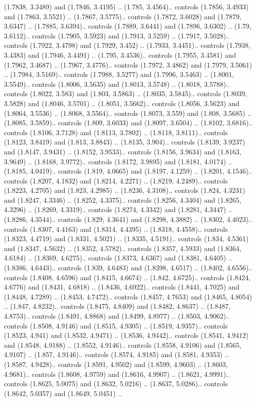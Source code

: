 (1.7838, 3.3489) and (1.7846, 3.4195) .. (1.785, 3.4564).. controls (1.7856, 3.4933) and (1.7863, 3.5521) .. (1.7867, 3.5775).. controls (1.7872, 3.6028) and (1.7879, 3.6347) .. (1.7885, 3.6394).. controls (1.7889, 3.6441) and (1.7896, 3.6302) .. (1.79, 3.6112).. controls (1.7905, 3.5923) and (1.7913, 3.5259) .. (1.7917, 3.5028).. controls (1.7922, 3.4798) and (1.7929, 3.452) .. (1.7933, 3.4451).. controls (1.7938, 3.4383) and (1.7946, 3.4491) .. (1.795, 3.4536).. controls (1.7955, 3.4581) and (1.7962, 3.4687) .. (1.7967, 3.4776).. controls (1.7972, 3.4862) and (1.7979, 3.5061) .. (1.7984, 3.5169).. controls (1.7988, 3.5277) and (1.7996, 3.5463) .. (1.8001, 3.5549).. controls (1.8006, 3.5635) and (1.8013, 3.5748) .. (1.8018, 3.5788).. controls (1.8022, 3.583) and (1.803, 3.5863) .. (1.8035, 3.5845).. controls (1.8039, 3.5828) and (1.8046, 3.5701) .. (1.8051, 3.5662).. controls (1.8056, 3.5623) and (1.8064, 3.5536) .. (1.8068, 3.5564).. controls (1.8073, 3.559) and (1.808, 3.5685) .. (1.8085, 3.5859).. controls (1.809, 3.6033) and (1.8097, 3.6504) .. (1.8102, 3.6816).. controls (1.8106, 3.7128) and (1.8113, 3.7802) .. (1.8118, 3.8111).. controls (1.8123, 3.8419) and (1.813, 3.8843) .. (1.8135, 3.904).. controls (1.8139, 3.9237) and (1.8147, 3.9431) .. (1.8152, 3.9533).. controls (1.8156, 3.9634) and (1.8163, 3.9649) .. (1.8168, 3.9772).. controls (1.8172, 3.9895) and (1.8181, 4.0174) .. (1.8185, 4.0419).. controls (1.819, 4.0665) and (1.8197, 4.1259) .. (1.8201, 4.1546).. controls (1.8207, 4.1832) and (1.8214, 4.2271) .. (1.8219, 4.2489).. controls (1.8223, 4.2705) and (1.823, 4.2985) .. (1.8236, 4.3108).. controls (1.824, 4.3231) and (1.8247, 4.3346) .. (1.8252, 4.3375).. controls (1.8256, 4.3404) and (1.8265, 4.3296) .. (1.8269, 4.3319).. controls (1.8274, 4.3342) and (1.8281, 4.3447) .. (1.8286, 4.3544).. controls (1.829, 4.3641) and (1.8298, 4.3882) .. (1.8302, 4.4023).. controls (1.8307, 4.4163) and (1.8314, 4.4395) .. (1.8318, 4.4558).. controls (1.8323, 4.4719) and (1.8331, 4.5021) .. (1.8335, 4.5191).. controls (1.834, 4.5361) and (1.8347, 4.5632) .. (1.8352, 4.5782).. controls (1.8357, 4.5933) and (1.8364, 4.6184) .. (1.8369, 4.6275).. controls (1.8373, 4.6367) and (1.8381, 4.6405) .. (1.8386, 4.6443).. controls (1.839, 4.6483) and (1.8398, 4.6517) .. (1.8402, 4.6556).. controls (1.8408, 4.6596) and (1.8415, 4.6674) .. (1.842, 4.6725).. controls (1.8424, 4.6776) and (1.8431, 4.6818) .. (1.8436, 4.6922).. controls (1.8441, 4.7025) and (1.8448, 4.7289) .. (1.8453, 4.7472).. controls (1.8457, 4.7653) and (1.8465, 4.8054) .. (1.847, 4.8232).. controls (1.8475, 4.8409) and (1.8482, 4.8637) .. (1.8487, 4.8753).. controls (1.8491, 4.8868) and (1.8499, 4.8977) .. (1.8503, 4.9062).. controls (1.8508, 4.9146) and (1.8515, 4.9305) .. (1.8519, 4.9357).. controls (1.8523, 4.941) and (1.8532, 4.9471) .. (1.8536, 4.9442).. controls (1.8541, 4.9412) and (1.8548, 4.9188) .. (1.8552, 4.9146).. controls (1.8558, 4.9106) and (1.8565, 4.9107) .. (1.857, 4.9146).. controls (1.8574, 4.9185) and (1.8581, 4.9353) .. (1.8587, 4.9428).. controls (1.8591, 4.9502) and (1.8599, 4.9603) .. (1.8603, 4.9681).. controls (1.8608, 4.9759) and (1.8616, 4.9907) .. (1.8621, 4.9991).. controls (1.8625, 5.0075) and (1.8632, 5.0216) .. (1.8637, 5.0286).. controls (1.8642, 5.0357) and (1.8649, 5.0451) .. 